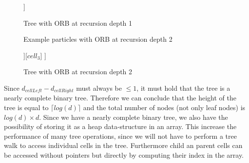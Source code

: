 \documentclass[]{article}
\begin{document}
\begin{figure}[H]
\centering
	\begin{forest}
		[$cell_1$
		[$cell_2$][$cell_3$]  
		]
	\end{forest}    
\caption{Tree with ORB at recursion depth 1}
\end{figure}

\begin{figure}[H]
	\begin{center}
    \end{center}
\caption{Example particles with ORB at recursion depth 2}
\label{fig:orb3}
\end{figure}

\begin{figure}[H]
	\centering
	\begin{forest}
		[$cell_1$
		[$cell_2$ [$cell_4$] [$cell_5$]][$cell_3$]  
		]
	\end{forest}
 \caption{Tree with ORB at recursion depth 2}
\end{figure}


Since $d_{cellLeft} - d_{cellRight}$ must always be $\leq 1$, it must hold that the tree is a nearly complete binary tree. Therefore we can conclude that the height of the tree is equal to $\lceil log(d) \rceil$ and the total number of nodes (not only leaf nodes) is $log(d) \times d$. Since we have a nearly complete binary tree, we also have the possibility of storing it as a heap\cite{algorithms} data-structure in an array.  This increase the performance of many tree operations, since we will not have to perform a tree walk to access individual cells in the tree. Furthermore child an parent cells can be accessed without pointers but directly by computing their index in the array.
\end{document}
